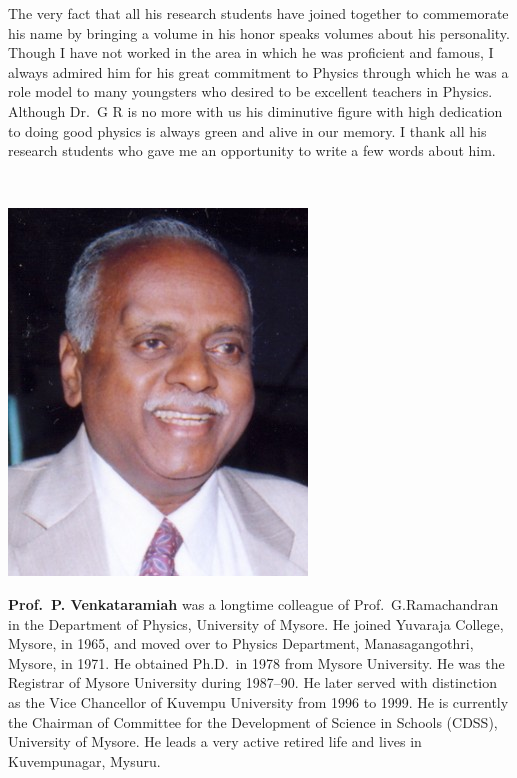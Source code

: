 The very fact that all his research students have joined together to commemorate his name by bringing a volume in his honor speaks volumes about his personality. Though I have not worked in the area in which he was proficient and famous, I always admired him for his great commitment to Physics through which he was a role model to many youngsters who desired to be excellent teachers in Physics. Although Dr.\ G R is no more with us his diminutive figure with high dedication to doing good physics is always green and alive in our memory. I thank all his research students who gave me an opportunity to write a few words about him.

\newpage

~
\vfill

\centerline{\includegraphics[scale=2]{authorsphotos/Prof_P_Venkataramaiah.jpg}}
\bigskip

\noindent
\textbf{Prof.\ P. Venkataramiah} was a longtime colleague of Prof.\ G.\break Ramachandran in the Department of Physics, University of Mysore. He joined Yuvaraja College, Mysore, in 1965, and moved over to Physics Department, Manasagangothri, Mysore, in 1971. He obtained Ph.D.\ in 1978 from Mysore University. He was the Registrar of Mysore University during 1987--90. He later served with distinction as the Vice Chancellor of Kuvempu University from 1996 to 1999. He is currently the Chairman of Committee for the Development of Science in Schools (CDSS), University of Mysore. He leads a very active retired life and lives in Kuvempunagar, Mysuru.
\vfill
